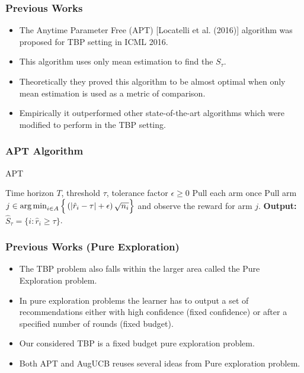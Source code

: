 \begin{frame}
\frametitle{Previous Works}
\begin{itemize}
\item<1-> The Anytime Parameter Free (APT) [{Locatelli et al. (2016)}] algorithm was proposed for TBP setting in ICML 2016. 
\item<2-> This algorithm uses only mean estimation to find the $S_{\tau}$. 
\item<3-> Theoretically they proved this algorithm to be almost optimal when only mean estimation is used as a metric of comparison.
\item<4-> Empirically it outperformed other state-of-the-art algorithms which were modified to perform in the TBP setting.  
\end{itemize}
\end{frame}

\begin{frame}
\frametitle{APT Algorithm}
\begin{algorithm}[H]
\caption{APT}
\begin{algorithmic}
 Time horizon $T$, threshold $\tau$, tolerance factor $\epsilon\geq 0$
\State Pull each arm once
\vspace{-3mm}
\State {}
\State Pull arm $j\in\operatorname*{arg\,min}_{i\in A}\Big\lbrace \left(|\hat{r}_{i} - \tau | + \epsilon\right)\sqrt{n_i}\Big\rbrace$ and observe the reward for arm $j$.
\EndFor
\State \textbf{Output:} $\hat{S}_{\tau}=\lbrace i: \hat{r}_{i}\geq \tau \rbrace$.
\end{algorithmic}
\end{algorithm}
\end{frame}

\begin{frame}
\frametitle{Previous Works (Pure Exploration)}
\begin{itemize}
\item<1-> The TBP problem also falls within the larger area called the Pure Exploration problem.
\item<2-> In pure exploration problems the learner has to output a set of recommendations either with high confidence (fixed confidence) or after a specified number of rounds (fixed budget).
\item<3-> Our considered TBP is a fixed budget pure exploration problem.
\item<4-> Both APT and AugUCB reuses several ideas from Pure exploration problem. 
\end{itemize}
\end{frame}

